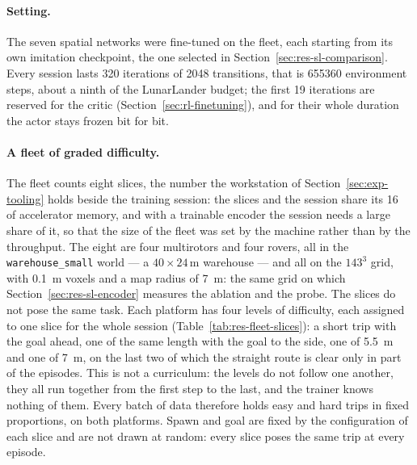 \paragraph{Setting.}
The seven spatial networks were fine-tuned on the fleet, each starting from its
own imitation checkpoint, the one selected in
Section~\ref{sec:res-sl-comparison}. Every session lasts \num{320} iterations
of \num{2048} transitions, that is \num{655360} environment steps, about a
ninth of the LunarLander budget; the first \num{19} iterations are reserved for
the critic (Section~\ref{sec:rl-finetuning}), and for their whole duration the
actor stays frozen bit for bit.

\paragraph{A fleet of graded difficulty.}
The fleet counts eight slices, the number the workstation of
Section~\ref{sec:exp-tooling} holds beside the training session: the slices
and the session share its \SI{16}{\gibi\byte} of accelerator memory, and with
a trainable encoder the session needs a large share of it, so that the size of
the fleet was set by the machine rather than by the throughput. The eight are
four multirotors and four rovers, all in the
\texttt{warehouse\_small} world --- a $40\times24$\,m warehouse --- and all on
the $143^3$ grid, with \SI{0.1}{\metre} voxels and a map radius of
\SI{7}{\metre}: the same grid on which Section~\ref{sec:res-sl-encoder} measures
the ablation and the probe. The slices do not pose the same task. Each platform
has four levels of difficulty, each assigned to one slice for the whole session
(Table~\ref{tab:res-fleet-slices}): a short trip with the goal ahead, one of the
same length with the goal to the side, one of \SI{5.5}{\metre} and one of
\SI{7}{\metre}, on the last two of which the straight route is clear only in
part of the episodes. This is not a curriculum: the levels do not follow one
another, they all run together from the first step to the last, and the trainer
knows nothing of them. Every batch of data therefore holds easy and hard trips
in fixed proportions, on both platforms. Spawn and goal are fixed by the
configuration of each slice and are not drawn at random: every slice poses the
same trip at every episode.

